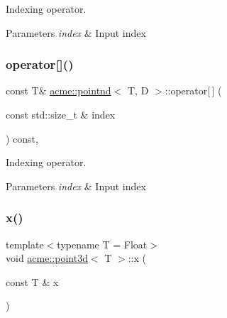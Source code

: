 Indexing operator. 


\begin{DoxyParams}{Parameters}
{\em index} & Input index \\
\hline
\end{DoxyParams}
\mbox{\label{classacme_1_1pointnd_a565e9ed195c8f8dadc570a029a3deb94}} 
\subsubsection{\texorpdfstring{operator[]()}{operator[]()}\hspace{0.1cm}{\footnotesize\ttfamily [2/2]}}
{\footnotesize\ttfamily const T\& \hyperlink{classacme_1_1pointnd}{acme\+::pointnd}$<$ T, D $>$\+::operator\mbox{[}$\,$\mbox{]} (\begin{DoxyParamCaption}\item[{const std\+::size\+\_\+t \&}]{index }\end{DoxyParamCaption}) const\hspace{0.3cm}{\ttfamily [inline]}, {\ttfamily [inherited]}}



Indexing operator. 


\begin{DoxyParams}{Parameters}
{\em index} & Input index \\
\hline
\end{DoxyParams}
\mbox{\label{classacme_1_1point3d_acccc28f082747904be0f39bd5972a40e}} 
\subsubsection{\texorpdfstring{x()}{x()}}
{\footnotesize\ttfamily template$<$typename T = Float$>$ \\
void \hyperlink{classacme_1_1point3d}{acme\+::point3d}$<$ T $>$\+::x (\begin{DoxyParamCaption}\item[{const T \&}]{x }\end{DoxyParamCaption})\hspace{0.3cm}{\ttfamily [inline]}}



